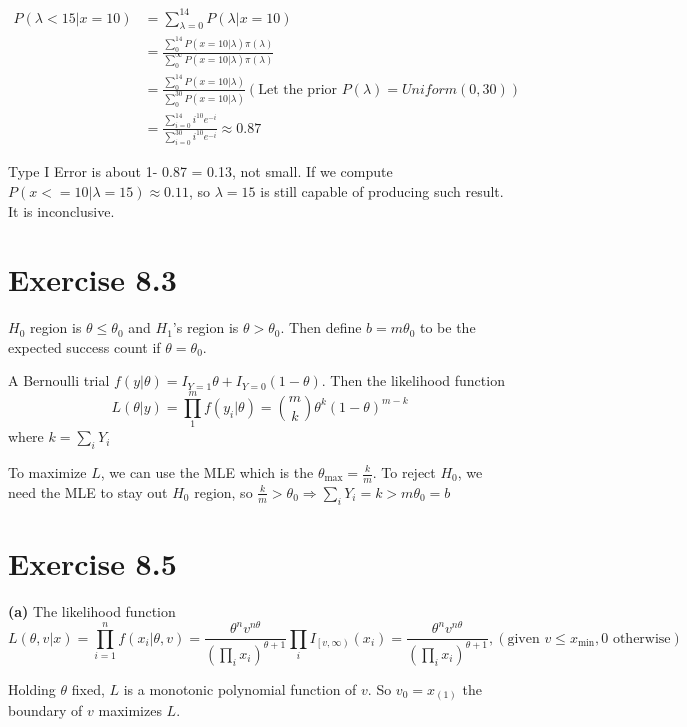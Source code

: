 \documentclass[12pt]{article}
\begin{document}
\begin{equation*}
\begin{split}
 P(\lambda < 15 | x = 10) &= \sum_{\lambda = 0}^{14} P(\lambda | x = 10) \\
  &= \frac{\sum_0^{14}  P(x= 10| \lambda)\pi(\lambda)}{\sum_0^\infty P(x=10|\lambda) \pi(\lambda)} \\
  &=  \frac{\sum_0^{14}  P(x= 10| \lambda)} {\sum_0^{30} P(x=10|\lambda)}  \left( \text{Let the prior } P(\lambda) = Uniform(0, 30) \right) \\
  &= \frac{\sum^{14}_{i = 0} i^{10} e^{-i}}{\sum^{30}_{i=0} i^{10} e^{-i}} \approx 0.87
\end{split}
\end{equation*}

Type I Error is about 1- 0.87 = 0.13, not small. If we compute $P(x <= 10 | \lambda = 15) \approx 0.11$, so $\lambda = 15$ is still capable of producing such result. It is inconclusive. 

\section*{Exercise 8.3}
$H_0$ region is $\theta \leq \theta_0$ and $H_1$'s region is $\theta > \theta_0$. Then define $b = m \theta_0$ to be the expected success count if $\theta = \theta_0$. 

A Bernoulli trial $f(y|\theta) = I_{Y=1}\theta + I_{Y=0}(1-\theta)$. Then the likelihood function $$L(\theta|y) = \prod_1^m f(y_i | \theta) ={m \choose k} \theta^k (1- \theta)^{m-k} $$ 
where $k = \sum_i Y_i$

To maximize $L$, we can use the MLE which is the $\theta_{\text{max}} = \frac{k}{m}$. To reject $H_0$, we need the MLE to stay out $H_0$ region, so $\frac{k}{m} > \theta_0 \Rightarrow  \sum_i Y_i = k > m\theta_0 = b$ 


\section*{Exercise 8.5}

\textbf{(a)} The likelihood function $$L(\theta, v|x) = \prod_{i=1}^n f(x_i |\theta, v) = \frac{\theta^n  v^{n\theta}}{(\prod_i x_i)^{\theta+1}} \prod_i I_{\left[v, \infty\right)}(x_i) = \frac{\theta^n  v^{n\theta}}{(\prod_i x_i)^{\theta+1}}, (\text{given } v \leq x_{\text{min}}, 0 {\text{ otherwise}})$$

Holding $\theta$ fixed, $L$ is a monotonic polynomial function of $v$. So $v_0 = x_{(1)}$ the boundary of $v$ maximizes $L$. 
\end{document}

